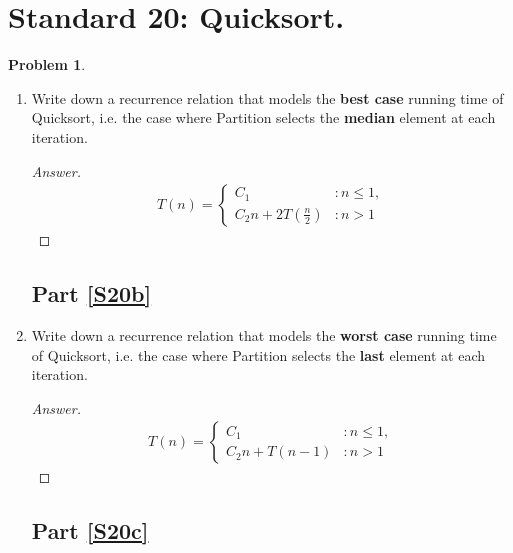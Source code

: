 \documentclass[11pt]{article}
\theoremstyle{definition}
\theoremstyle{definition}
\newtheorem{required}{Problem}
\theoremstyle{definition}
\begin{document}
\newpage
\section{Standard 20: Quicksort.}

\begin{required}
\begin{enumerate}[label=(\alph*)]
\subsection{Part \ref{S20a}}

\item \label{S20a} Write down a recurrence relation that models the {\bf best case} running time of Quicksort, i.e. the case where {\sc Partition} selects the {\bf median} element at each iteration.

\begin{proof}[Answer]
\begin{align*}
T(n) = \begin{cases}
\text{$C_1$} & : n \leq 1, \\
\text{$C_2n+2T(\frac{n}{2})$} & : n > 1
\end{cases}
\end{align*}
\end{proof}


\newpage 
\subsection{Part \ref{S20b}}
\item \label{S20b} Write down a recurrence relation that models the {\bf worst case} running time of Quicksort, i.e. the case where {\sc Partition} selects the {\bf last} element at each iteration.

\begin{proof}[Answer]
\begin{align*}
T(n) = \begin{cases}
\text{$C_1$} & : n \leq 1, \\
\text{$C_2n+T(n-1)$} & : n > 1
\end{cases}
\end{align*}
\end{proof}



\newpage
\subsection{Part \ref{S20c} }


\end{enumerate}
\end{required}
\end{document}
